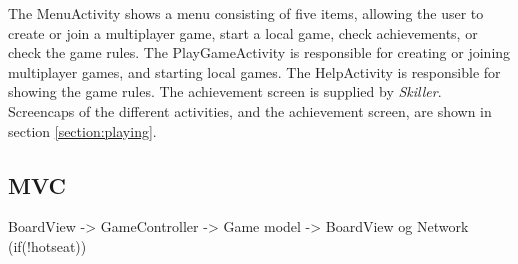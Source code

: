 The MenuActivity shows a menu consisting of five items, allowing the user to create or join a multiplayer game, start a local game, check achievements, or check the game rules. The PlayGameActivity is responsible for creating or joining multiplayer games, and starting local games. The HelpActivity is responsible for showing the game rules. The achievement screen is supplied by \emph{Skiller}.\\

Screencaps of the different activities, and the achievement screen, are shown in section \ref{section:playing}.

\subsection{MVC}
BoardView -> GameController -> Game model -> BoardView og Network (if(!hotseat))






